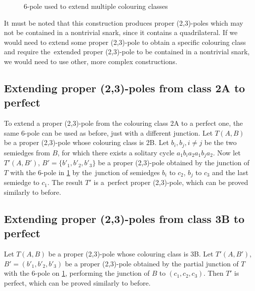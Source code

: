 \begin{figure}[h]
	\centering
	\scalebox{0.7}{
		
	}
	\caption{6-pole used to extend multiple colouring classes}
	\label{fig:multiple}
\end{figure}

It must be noted that this construction produces proper (2,3)-poles which may not be contained in a nontrivial snark, since it contains a quadrilateral. If we would need to extend some proper (2,3)-pole to obtain a specific colouring class and require the~extended proper (2,3)-pole to be contained in a nontrivial snark, we would need to use other, more complex constructions.

\subsection{Extending proper (2,3)-poles from class 2A to perfect}

To extend a proper (2,3)-pole from the colouring class 2A to a perfect one, the same 6-pole can be used as before, just with a different junction. Let $T(A,B)$ be a proper (2,3)-pole whose colouring class is 2B. Let $b_i,b_j,i\neq j$ be the two semiedges from $B$, for which there exists a solitary cycle $a_1b_ia_2a_1b_ja_2$. Now let $T'(A,B')$, $B'=\{b'_1, b'_2, b'_3\}$ be a proper (2,3)-pole obtained by the junction of $T$ with the 6-pole in \cref{fig:multiple} by the~junction of semiedges $b_i$ to $c_2$, $b_j$ to $c_3$ and the last semiedge to $c_1$. The result $T'$ is a~perfect proper (2,3)-pole, which can be proved similarly to before.


\subsection{Extending proper (2,3)-poles from class 3B to perfect}

Let $T(A,B)$ be a proper (2,3)-pole whose colouring class is 3B. Let $T'(A,B')$, \linebreak ${B'=(b'_1, b'_2, b'_3)}$ be a proper (2,3)-pole obtained by the partial junction of $T$ with the 6-pole on \cref{fig:multiple}, performing the junction of $B$ to $(c_1,c_2,c_3)$. Then $T'$ is perfect, which can be proved similarly to before.

